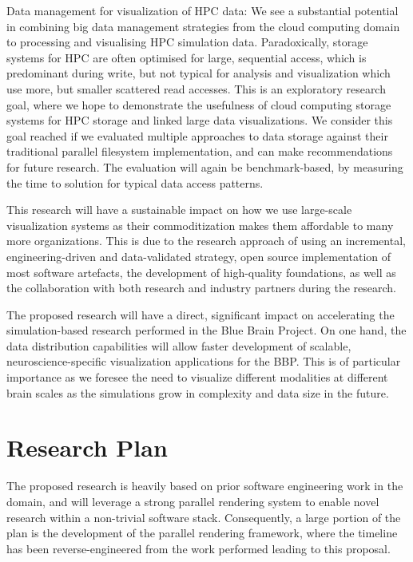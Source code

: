 \begin{compactdesc}
  \item [Data management for visualization of HPC data:] We see a substantial
  potential in combining big data management strategies from the cloud computing
  domain to processing and visualising HPC simulation data. Paradoxically, storage
  systems for HPC are often optimised for large, sequential access, which is
  predominant during write, but not typical for analysis and visualization which
  use more, but smaller scattered read accesses. This is an exploratory research
  goal, where we hope to demonstrate the usefulness of cloud computing storage
  systems for HPC storage and linked large data visualizations. We consider this
  goal reached if we evaluated multiple approaches to data storage against their
  traditional parallel filesystem implementation, and can make recommendations for
  future research. The evaluation will again be benchmark-based, by measuring the
  time to solution for typical data access patterns.
 \end{compactdesc}

 This research will have a sustainable impact on how we use large-scale
 visualization systems as their commoditization makes them affordable to many
 more organizations. This is due to the research approach of using an
 incremental, engineering-driven and data-validated strategy, open source
 implementation of most software artefacts, the development of high-quality
 foundations, as well as the collaboration with both research and industry
 partners during the research.

 The proposed research will have a direct, significant impact on accelerating the
 simulation-based research performed in the Blue Brain Project. On one hand, the
 data distribution capabilities will allow faster development of scalable,
 neuroscience-specific visualization applications for the BBP. This is of
 particular importance as we foresee the need to visualize different modalities
 at different brain scales as the simulations grow in complexity and data size in
 the future.

 \chapter{Research Plan\label{sPlan}}

 The proposed research is heavily based on prior software engineering work in the
 domain, and will leverage a strong parallel rendering system to enable novel
 research within a non-trivial software stack. Consequently, a large portion of
 the plan is the development of the parallel rendering framework, where the
 timeline has been reverse-engineered from the work performed leading to this
 proposal.


